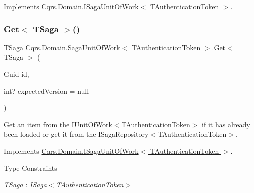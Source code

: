 Implements \hyperlink{interfaceCqrs_1_1Domain_1_1ISagaUnitOfWork_aaa8a63b5304c837deec8a0103eb702f7_aaa8a63b5304c837deec8a0103eb702f7}{Cqrs.\+Domain.\+I\+Saga\+Unit\+Of\+Work$<$ T\+Authentication\+Token $>$}.

\mbox{\label{classCqrs_1_1Domain_1_1SagaUnitOfWork_acebe159e3b27e36a91909e97cf37d28d_acebe159e3b27e36a91909e97cf37d28d}} 
\subsubsection{\texorpdfstring{Get$<$ T\+Saga $>$()}{Get< TSaga >()}}
{\footnotesize\ttfamily T\+Saga \hyperlink{classCqrs_1_1Domain_1_1SagaUnitOfWork}{Cqrs.\+Domain.\+Saga\+Unit\+Of\+Work}$<$ T\+Authentication\+Token $>$.Get$<$ T\+Saga $>$ (\begin{DoxyParamCaption}\item[{Guid}]{id,  }\item[{int?}]{expected\+Version = {\ttfamily null} }\end{DoxyParamCaption})}



Get an item from the I\+Unit\+Of\+Work$<$\+T\+Authentication\+Token$>$ if it has already been loaded or get it from the I\+Saga\+Repository$<$\+T\+Authentication\+Token$>$. 



Implements \hyperlink{interfaceCqrs_1_1Domain_1_1ISagaUnitOfWork_a4c4745fcebc42ba5c94647b22939809b_a4c4745fcebc42ba5c94647b22939809b}{Cqrs.\+Domain.\+I\+Saga\+Unit\+Of\+Work$<$ T\+Authentication\+Token $>$}.

\begin{Desc}
\item[Type Constraints]\begin{description}
\item[{\em T\+Saga} : {\em I\+Saga$<$T\+Authentication\+Token$>$}]\end{description}
\end{Desc}
